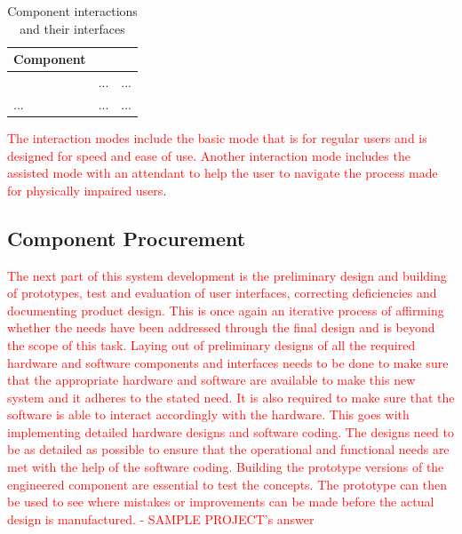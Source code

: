 \documentclass[a4paper,11pt,fleqn]{report}
\begin{document}
%
\begin{table}[h!]
\caption {Component interactions and their interfaces} \label{tb: Components & interfaces} 
\begin{center}
\begin{tabular}{p{4cm}|p{4cm}|p{4cm}}\toprule
	{\textbf{Component}} & {\textbf{Interaction} & {\textbf{Interface}\\ \midrule
    \textcolor{Format used by sample project} & ... & ...\\
    \hline
    ... & ... & ...\\

    \bottomrule
\end{tabular}
\end{center}
\end{table}
%
\textcolor{red}{The interaction modes include the basic mode that is for regular users and is designed for speed and ease of use. Another interaction mode includes the assisted mode with an attendant to help the user to navigate the process made for physically impaired users}.

\subsection{Component Procurement}
\textcolor{red}{The next part of this system development is the preliminary design and building of prototypes, test and evaluation of user interfaces, correcting deficiencies and documenting product design. This is once again an iterative process of affirming whether the needs have been addressed through the final design and is beyond the scope of this task. Laying out of preliminary designs of all the required hardware and software components and interfaces needs to be done to make sure that the appropriate hardware and software are available to make this new system and it adheres to the stated need. It is also required to make sure that the software is able to interact accordingly with the hardware. This goes with implementing detailed hardware designs and software coding. The designs need to be as detailed as possible to ensure that the operational and functional needs are met with the help of the software coding. Building the prototype versions of the engineered component are essential to test the concepts. The prototype can then be used to see where mistakes or improvements can be made before the actual design is manufactured. - SAMPLE PROJECT's answer}
\end{document}
